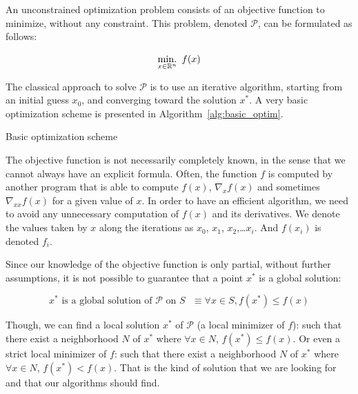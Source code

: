 An unconstrained optimization problem consists of an objective function to minimize, without any constraint.
This problem, denoted $\mathcal{P}$, can be formulated as follows:

\begin{equation}
  \operatorname*{min.}_{x\in\mathbb{R}^n}\ {f(x)}
\label{eq:unconstrainedOptim}
\end{equation}

The classical approach to solve $\mathcal{P}$ is to use an iterative algorithm, starting from an initial guess $x_0$, and converging toward the solution $x^*$.
A very basic optimization scheme is presented in Algorithm~\ref{alg:basic_optim}.

\begin{algorithm}
\begin{algorithmic}
  \EndWhile{}
  \caption{Basic optimization scheme}
\label{alg:basic_optim}
\end{algorithmic}
\end{algorithm}

The objective function is not necessarily completely known, in the sense that we cannot always have an explicit formula. Often, the function $f$ is computed by another program that is able to compute $f(x)$, $\nabla_x f(x)$ and sometimes $\nabla_{xx} f(x)$ for a given value of $x$.
In order to have an efficient algorithm, we need to avoid any unnecessary computation of $f(x)$ and its derivatives.
We denote the values taken by $x$ along the iterations as $x_0$, $x_1$, $x_2$,\ldots $x_i$.
And $f(x_i)$ is denoted $f_i$.

Since our knowledge of the objective function is only partial, without further assumptions, it is not possible to guarantee that a point $x^*$ is a global solution:

\begin{equation}
  \text{$x^*$ is a global solution of $\mathcal{P}$ on $\mathit{S}$ } \equiv \forall x \in \mathit{S}, f(x^*) \leq f(x)
\end{equation}

Though, we can find a local solution $x^*$ of $\mathcal{P}$ (a local minimizer of $f$): such that there exist a neighborhood $\mathit{N}$ of $x^*$ where $\forall x\in \mathit{N}$, $f(x^*) \leq f(x)$.
Or even a strict local minimizer of $f$: such that there exist a neighborhood $\mathit{N}$ of $x^*$ where $\forall x\in \mathit{N}$, $f(x^*) < f(x)$.
That is the kind of solution that we are looking for and that our algorithms should find.

